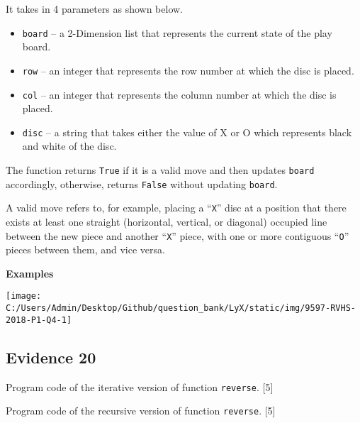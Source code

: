 It takes in 4 parameters as shown below. 
\begin{itemize}
\item \texttt{board} -- a 2-Dimension list that represents the current
state of the play board.
\item \texttt{row} -- an integer that represents the row number at which
the disc is placed. 
\item \texttt{col} -- an integer that represents the column number at which
the disc is placed. 
\item \texttt{disc} -- a string that takes either the value of \textquotedbl X\textquotedbl{}
or \textquotedbl O\textquotedbl{} which represents black and white
of the disc. 
\end{itemize}
The function returns \texttt{True} if it is a valid move and then
updates \texttt{board} accordingly, otherwise, returns \texttt{False}
without updating \texttt{board}. 

A valid move refers to, for example, placing a \textquotedblleft \texttt{X}\textquotedblright{}
disc at a position that there exists at least one straight (horizontal,
vertical, or diagonal) occupied line between the new piece and another
\textquotedblleft \texttt{X}\textquotedblright{} piece, with one or
more contiguous \textquotedblleft \texttt{O}\textquotedblright{} pieces
between them, and vice versa. 

\textbf{Examples }
\begin{center}
\texttt{[image: C:/Users/Admin/Desktop/Github/question\_bank/LyX/static/img/9597-RVHS-2018-P1-Q4-1]}
\par\end{center}

\subsection*{Evidence 20}

Program code of the iterative version of function \texttt{reverse}.
\hfill{}{[}5{]}

Program code of the recursive version of function \texttt{reverse}.
\hfill{}{[}5{]}